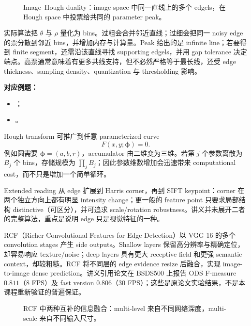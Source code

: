 \begin{figure}[htbp]
  \centering
  \resizebox{0.94\textwidth}{!}{}
  \caption{Image--Hough duality：image space 中同一直线上的多个 edgels，在 Hough space 中投票给共同的 parameter peak。}
  \label{fig:sc4061-l06-hough-voting}
\end{figure}

实际算法把 $\theta$ 与 $\rho$ 量化为 bins。过粗会合并邻近直线；过细会把同一 noisy edge 的票分散到邻近 bins，并增加内存与计算量。Peak 给出的是 infinite line；若要得到 finite segment，还需沿该直线寻找 supporting edgels，并用 gap tolerance 决定端点。高票通常意味着有更多共线支持，但不必然严格等于最长线，还受 edge thickness、sampling density、quantization 与 thresholding 影响。

\textbf{对应例题：}
\begin{itemize}
  \item {}；
  \item {}。
\end{itemize}

Hough transform 可推广到任意 parameterized curve
\[
  F(x,y;\boldsymbol\phi)=0.
\]
例如圆需要 $\boldsymbol\phi=(a,b,r)$，accumulator 由二维变为三维。若第 $j$ 个参数离散为 $B_j$ 个 bins，存储规模为 $\prod_j B_j$；因此参数维数增加会迅速带来 computational cost，而不只是增加一个简单循环。


Extended reading 从 edge 扩展到 Harris corner，再到 SIFT keypoint：corner 在两个独立方向上都有明显 intensity change；更一般的 feature point 只要求局部结构 distinctive（可区分），并可追求 scale/rotation robustness。讲义并未展开二者的完整算法，重点是说明 edge 只是视觉特征的一种。

RCF（Richer Convolutional Features for Edge Detection）以 VGG-16 的多个 convolution stages 产生 side outputs。Shallow layers 保留高分辨率与精确定位，却容易响应 texture/noise；deep layers 具有更大 receptive field 和更强 semantic context，却较粗糙。RCF 将不同层的 edge evidence resize 后融合，实现 image-to-image dense prediction。讲义引用论文在 BSDS500 上报告 ODS F-measure $0.811$（8 FPS）及 fast version $0.806$（30 FPS）；这些是原论文实验结果，不是本课程重新验证的普遍保证。

\begin{figure}[htbp]
  \centering
  \resizebox{0.94\textwidth}{!}{}
  \caption{RCF 中两种互补的信息融合：multi-level 来自不同网络深度，multi-scale 来自不同输入尺寸。}
  \label{fig:sc4061-l06-rcf-fusion}
\end{figure}

